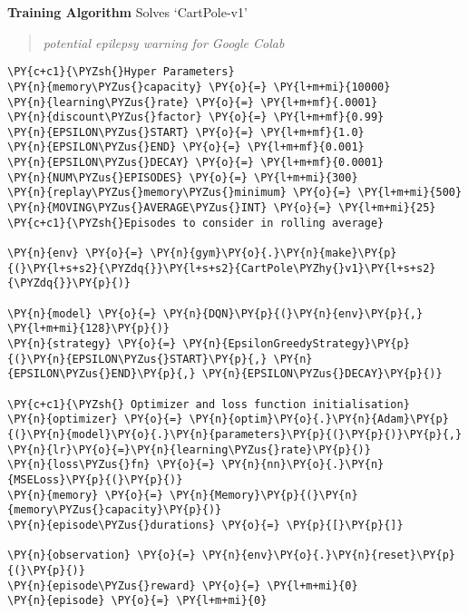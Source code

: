     \textbf{Training Algorithm} \textbar{} Solves `CartPole-v1'

\begin{quote}
\emph{potential epilepsy warning for Google Colab}
\end{quote}

    \begin{tcolorbox}[breakable, size=fbox, boxrule=1pt, pad at break*=1mm,colback=cellbackground, colframe=cellborder]
\begin{Verbatim}[commandchars=\\\{\}]
\PY{c+c1}{\PYZsh{}Hyper Parameters}
\PY{n}{memory\PYZus{}capacity} \PY{o}{=} \PY{l+m+mi}{10000}
\PY{n}{learning\PYZus{}rate} \PY{o}{=} \PY{l+m+mf}{.0001}
\PY{n}{discount\PYZus{}factor} \PY{o}{=} \PY{l+m+mf}{0.99}
\PY{n}{EPSILON\PYZus{}START} \PY{o}{=} \PY{l+m+mf}{1.0}
\PY{n}{EPSILON\PYZus{}END} \PY{o}{=} \PY{l+m+mf}{0.001}
\PY{n}{EPSILON\PYZus{}DECAY} \PY{o}{=} \PY{l+m+mf}{0.0001}
\PY{n}{NUM\PYZus{}EPISODES} \PY{o}{=} \PY{l+m+mi}{300}
\PY{n}{replay\PYZus{}memory\PYZus{}minimum} \PY{o}{=} \PY{l+m+mi}{500}
\PY{n}{MOVING\PYZus{}AVERAGE\PYZus{}INT} \PY{o}{=} \PY{l+m+mi}{25}  \PY{c+c1}{\PYZsh{}Episodes to consider in rolling average}

\PY{n}{env} \PY{o}{=} \PY{n}{gym}\PY{o}{.}\PY{n}{make}\PY{p}{(}\PY{l+s+s2}{\PYZdq{}}\PY{l+s+s2}{CartPole\PYZhy{}v1}\PY{l+s+s2}{\PYZdq{}}\PY{p}{)}

\PY{n}{model} \PY{o}{=} \PY{n}{DQN}\PY{p}{(}\PY{n}{env}\PY{p}{,} \PY{l+m+mi}{128}\PY{p}{)}
\PY{n}{strategy} \PY{o}{=} \PY{n}{EpsilonGreedyStrategy}\PY{p}{(}\PY{n}{EPSILON\PYZus{}START}\PY{p}{,} \PY{n}{EPSILON\PYZus{}END}\PY{p}{,} \PY{n}{EPSILON\PYZus{}DECAY}\PY{p}{)}

\PY{c+c1}{\PYZsh{} Optimizer and loss function initialisation}
\PY{n}{optimizer} \PY{o}{=} \PY{n}{optim}\PY{o}{.}\PY{n}{Adam}\PY{p}{(}\PY{n}{model}\PY{o}{.}\PY{n}{parameters}\PY{p}{(}\PY{p}{)}\PY{p}{,} \PY{n}{lr}\PY{o}{=}\PY{n}{learning\PYZus{}rate}\PY{p}{)}
\PY{n}{loss\PYZus{}fn} \PY{o}{=} \PY{n}{nn}\PY{o}{.}\PY{n}{MSELoss}\PY{p}{(}\PY{p}{)}
\PY{n}{memory} \PY{o}{=} \PY{n}{Memory}\PY{p}{(}\PY{n}{memory\PYZus{}capacity}\PY{p}{)}
\PY{n}{episode\PYZus{}durations} \PY{o}{=} \PY{p}{[}\PY{p}{]}

\PY{n}{observation} \PY{o}{=} \PY{n}{env}\PY{o}{.}\PY{n}{reset}\PY{p}{(}\PY{p}{)}
\PY{n}{episode\PYZus{}reward} \PY{o}{=} \PY{l+m+mi}{0}
\PY{n}{episode} \PY{o}{=} \PY{l+m+mi}{0}


\end{Verbatim}
\end{tcolorbox}
